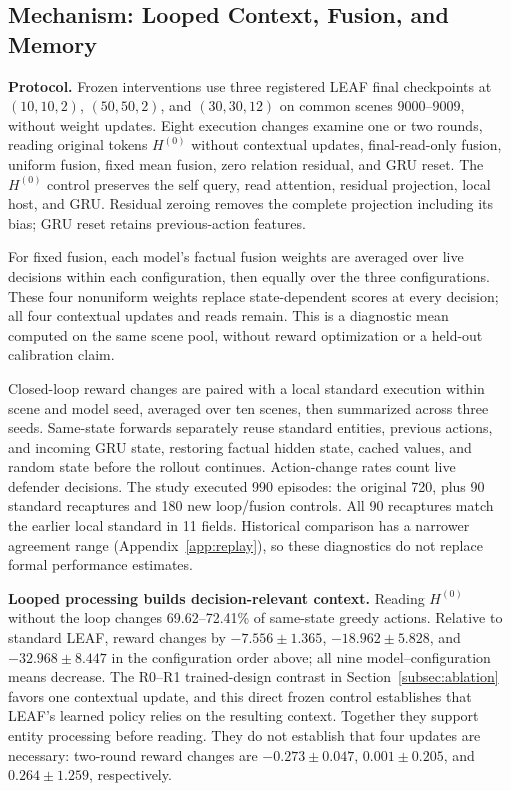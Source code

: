 \subsection{Mechanism: Looped Context, Fusion, and Memory}
\label{subsec:mechanism}
\noindent\textbf{Protocol.}
Frozen interventions use three registered LEAF final checkpoints at $(10,10,2)$, $(50,50,2)$, and $(30,30,12)$ on common scenes 9000--9009, without weight updates. Eight execution changes examine one or two rounds, reading original tokens $H^{(0)}$ without contextual updates, final-read-only fusion, uniform fusion, fixed mean fusion, zero relation residual, and GRU reset. The $H^{(0)}$ control preserves the self query, read attention, residual projection, local host, and GRU. Residual zeroing removes the complete projection including its bias; GRU reset retains previous-action features.

For fixed fusion, each model's factual fusion weights are averaged over live decisions within each configuration, then equally over the three configurations. These four nonuniform weights replace state-dependent scores at every decision; all four contextual updates and reads remain. This is a diagnostic mean computed on the same scene pool, without reward optimization or a held-out calibration claim.

Closed-loop reward changes are paired with a local standard execution within scene and model seed, averaged over ten scenes, then summarized across three seeds. Same-state forwards separately reuse standard entities, previous actions, and incoming GRU state, restoring factual hidden state, cached values, and random state before the rollout continues. Action-change rates count live defender decisions. The study executed 990 episodes: the original 720, plus 90 standard recaptures and 180 new loop/fusion controls. All 90 recaptures match the earlier local standard in 11 fields. Historical comparison has a narrower agreement range (Appendix~\ref{app:replay}), so these diagnostics do not replace formal performance estimates.

\noindent\textbf{Looped processing builds decision-relevant context.}
Reading $H^{(0)}$ without the loop changes 69.62--72.41\% of same-state greedy actions. Relative to standard LEAF, reward changes by $-7.556\pm1.365$, $-18.962\pm5.828$, and $-32.968\pm8.447$ in the configuration order above; all nine model--configuration means decrease. The R0--R1 trained-design contrast in Section~\ref{subsec:ablation} favors one contextual update, and this direct frozen control establishes that LEAF's learned policy relies on the resulting context. Together they support entity processing before reading. They do not establish that four updates are necessary: two-round reward changes are $-0.273\pm0.047$, $0.001\pm0.205$, and $0.264\pm1.259$, respectively.

